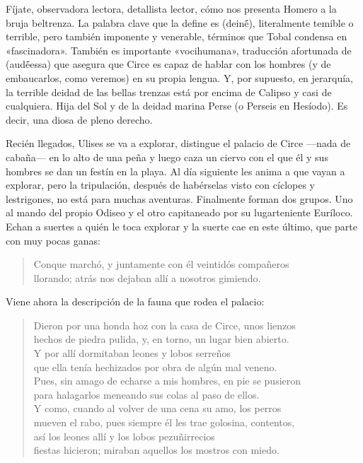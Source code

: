 Fíjate, observadora lectora, detallista lector, cómo nos presenta Homero a la bruja beltrenza. La palabra clave que la define es  (deinḗ), literalmente temible o terrible, pero también imponente y venerable, términos que Tobal condensa en «fascinadora». También es importante «vocihumana», traducción afortunada de  (audḗessa) que asegura que Circe es capaz de hablar con los hombres (y de embaucarlos, como veremos) en su propia lengua. Y, por supuesto, en jerarquía, la terrible deidad de las bellas trenzas está por encima de Calipso y casi de cualquiera. Hija del Sol y de la deidad marina Perse (o Perseis en Hesíodo). Es decir, una diosa de pleno derecho.

Recién llegados, Ulises se va a explorar, distingue el palacio de Circe ---nada de cabaña--- en lo alto de una peña y luego caza un ciervo con el que él y sus hombres se dan un festín en la playa. Al día siguiente les anima a que vayan a explorar, pero la tripulación, después de habérselas visto con cíclopes y lestrigones, no está para muchas aventuras. Finalmente forman dos grupos. Uno al mando del propio Odiseo y el otro capitaneado por su lugarteniente Euríloco. Echan a suertes a quién le toca explorar y la suerte cae en este último, que parte con muy pocas ganas:

\begin{verse}
Conque marchó, y juntamente con él veintidós compañeros\\
llorando; atrás nos dejaban allí a nosotros gimiendo.
\end{verse}

Viene ahora la descripción de la fauna que rodea el palacio:

\begin{verse}
Dieron por una honda hoz con la casa de Circe, unos lienzos\\
hechos de piedra pulida, y, en torno, un lugar bien abierto.\\
Y por allí dormitaban leones y lobos serreños\\
que ella tenía hechizados por obra de algún mal veneno.\\
Pues, sin amago de echarse a mis hombres, en pie se pusieron\\
para halagarlos meneando sus colas al paso de ellos.\\
Y como, cuando al volver de una cena su amo, los perros\\
mueven el rabo, pues siempre él les trae golosina, contentos,\\
así los leones allí y los lobos pezuñirrecios\\
fiestas hicieron; miraban aquellos los mostros con miedo.
\end{verse}

